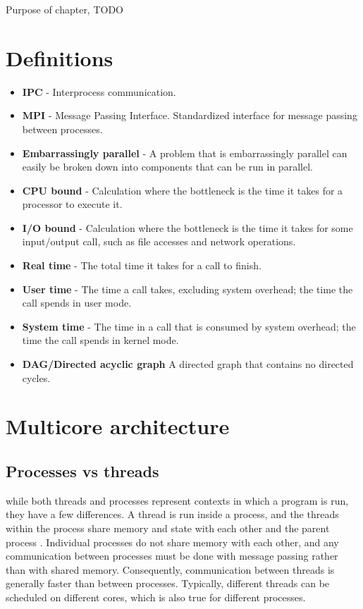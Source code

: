 Purpose of chapter, TODO

\section{Definitions}
\begin{itemize}
  \item \textbf{IPC} - Interprocess communication.
  \item \textbf{MPI} - Message Passing Interface. Standardized interface for message passing between processes.
  \item \textbf{Embarrassingly parallel} - A problem that is embarrassingly parallel can easily be broken down into components that
    can be run in parallel. %
  \item \textbf{CPU bound} - Calculation where the bottleneck is the time it takes for a processor to execute it.
  \item \textbf{I/O bound} - Calculation where the bottleneck is the time it takes for some input/output call, such as file accesses
    and network operations.
  \item \textbf{Real time} - The total time it takes for a call to finish.
  \item \textbf{User time} - The time a call takes, excluding system overhead; the time the call spends in user mode.
  \item \textbf{System time} - The time in a call that is consumed by system overhead; the time the call spends in kernel mode.
  \item \textbf{DAG/Directed acyclic graph} A directed graph that contains no directed cycles.
\end{itemize}

\section{Multicore architecture} %
\subsection{Processes vs threads}
while both threads and processes represent contexts in which a program is run, they have a few differences. A thread is run inside
a process, and the threads within the process share memory and state with each other and the parent
process \cite{singh_2013_parallel_padpwprfmm}. Individual processes do not share memory with each other, and any
communication between processes must be done with message passing rather than with shared memory. Consequently, communication
between threads is generally faster than between processes.
Typically, different threads can be scheduled on different cores, which is also true for different processes. %

